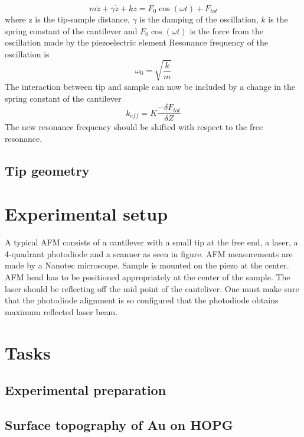 \documentclass{article}
\begin{document}
 \begin{equation}
     m\ddot{z} + \gamma \dot{z} + kz = F_{0}\cos(\omega t) + F_{tot}
 \end{equation}
where z is the tip-sample distance, $\gamma$ is the damping of the oscillation, $k$ is the spring constant of the cantilever and $F_{0}\cos(\omega t)$ is the force from the oscillation made by the piezoelectric element
Resonance frequency of the oscillation is \begin{equation}
    \omega_{0} = \sqrt{\frac{k}{m}}
\end{equation}
The interaction between tip and sample can now be included by a change in the spring constant of the cantilever 
\begin{equation}
    k_{eff} = K \frac{-\delta F_{tot}}{\delta Z} 
\end{equation}
The new resonance frequency should be shifted with respect to the free resonance. 

\subsection{Tip geometry}

\section{Experimental setup}
A typical AFM consists of a cantilever with a small tip at the free end, a laser, a 4-quadrant photodiode and a scanner as seen in figure. AFM measurements are made by a Nanotec microscope. Sample is mounted on the piezo at the center. AFM head has to be positioned appropriately at the center of the sample. The laser should be reflecting off the mid point of the canteliver. One must make sure that the photodiode alignment is so configured that the photodiode obtains maximum reflected laser beam.
\section{Tasks}

\subsection{Experimental preparation}

\subsection{Surface topography of Au on HOPG}
\end{document}
